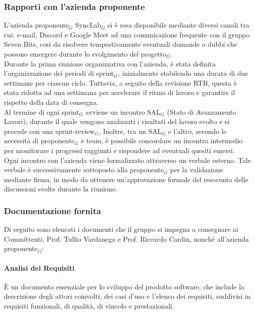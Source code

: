 \documentclass[10pt]{article}
\begin{document}
\begin{justify}
    \subsubsection{Rapporti con l'azienda proponente}
    L'azienda proponente$_G$ SyncLab$_G$ si è resa disponibile mediante diversi canali tra cui: e-mail, Discord e Google Meet ad una comunicazione frequente con il gruppo Seven Bits, così da risolvere tempestivamente eventuali domande o dubbi che possono emergere durante lo svolgimento del progetto$_G$.\\
    Durante la prima riunione organizzativa con l'azienda, è stata definita l'organizzazione dei periodi di sprint$_G$, inizialmente stabilendo una durata di due settimane per ciascun ciclo. Tuttavia, a seguito della revisione RTB, questa è stata ridotta ad una settimana per accelerare il ritmo di lavoro e garantire il rispetto della data di consegna.\\
    Al termine di ogni sprint$_G$ avviene un incontro SAL$_G$ (Stato di Avanzamento Lavori), durante il quale vengono analizzati i risultati del lavoro svolto e si procede con una sprint-review$_G$. Inoltre, tra un SAL$_G$ e l'altro, secondo le necessità di proponente$_G$ e team, è possibile concordare un incontro intermedio per monitorare i progressi raggiunti e rispondere ad eventuali quesiti emersi.\\
    Ogni incontro con l'azienda viene formalizzato attraverso un verbale esterno. Tale verbale è successivamente sottoposto alla proponente$_G$ per la validazione mediante firma, in modo da ottenere un'approvazione formale del resoconto delle discussioni svolte durante la riunione.\\

    \subsubsection{Documentazione fornita}
    Di seguito sono elencati i documenti che il gruppo si impegna a consegnare ai Committenti, Prof. Tullio Vardanega e Prof. Riccardo Cardin, nonché all'azienda proponente$_G$:\\

        \paragraph{Analisi dei Requisiti}
        È un documento essenziale per lo sviluppo del prodotto software, che include la descrizione degli attori coinvolti, dei casi d'uso e l'elenco dei requisiti, suddivisi in requisiti funzionali, di qualità, di vincolo e prestazionali.\\


\end{justify}
\end{document}
